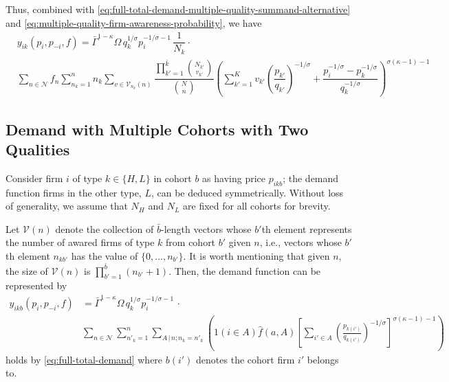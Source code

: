 \documentclass[12pt]{article}
\begin{document}
Thus, combined with \eqref{eq:full-total-demand-multiple-quality-summand-alternative} and \eqref{eq:multiple-quality-firm-awareness-probability}, we have
\begin{align}
& y_{ik}(p_i, p_{-i}, f) 
=  \bar{\Gamma}^{1-\kappa}\Omega \, q_k^{1/\sigma}p_i^{-1/\sigma - 1}\, \dfrac{1}{N_k} \cdot \\ 
&\sum_{n \in \mathcal{N} } f_n   \sum_{n_k =1}^n  
n_k \sum_{v \in \mathcal{V}_{n_k} (n)} 
\dfrac{\prod_{k'=1}^{\bar k} \binom{ N_{k'} }{ v_{k'} } }{\binom{N}{n}}
\left( 
\sum_{k' =1 }^{K} v_{k'} \left( \dfrac{p_{k'}}{q_{k'}}  \right)^{-1/\sigma} +   
\dfrac{p_i^{-1/\sigma}   - p^{-1/\sigma}_{k} }{{ q_k^{-1/\sigma }}}
\right)^{\sigma (\kappa - 1)-1}
\end{align}

\subsection{Demand with Multiple Cohorts with Two Qualities}
Consider firm $i$ of type $k \in \{H, L\}$ in cohort $b$ as having price $p_{ikb}$; the demand function firms in the other type, $L$, can be deduced symmetrically. Without loss of generality, we assume that $N_H$ and $N_L$ are fixed for all cohorts for brevity.  

Let $\mathcal{V} (n)$ denote the collection of $\bar b$-length vectors whose $b'$th element represents the number of awared firms of type $k$ from cohort $b'$ given $n$, i.e., vectors whose $b'$th element $n_{kb'}$ has the value of $\{0,..., n_{b'} \}$. It is worth mentioning that given $n$, the size of $\mathcal{V} (n)$ is $\prod_{b'=1}^{\bar b} (n_{b'} + 1)$. Then, the demand function can be represented by
\begin{align}
y_{ikb}(p_i, p_{-i}, f) &= \bar{\Gamma}^{1-\kappa}\Omega \, q_k^{1/\sigma}p_i^{-1/\sigma - 1}\, \cdot \\
& \sum_{n \in \mathcal{N} } \sum_{n'_k =1}^n \sum_{{A}\,|\,n; n_k = n'_k}\left( 1( i \in A ) \hat{f}(a,A)\left[\sum_{i'\in A}\left( \frac{p_{k(i')}}{q_{k(i')}}\right)^{-1/\sigma}\right]^{\sigma (\kappa - 1)-1}\right)  
\label{eq:full-total-demand-multiple-cohorts-two-quality}
\end{align}
holds by \cref{eq:full-total-demand} where $b(i')$ denotes the cohort firm $i'$ belongs to. 
\end{document}
